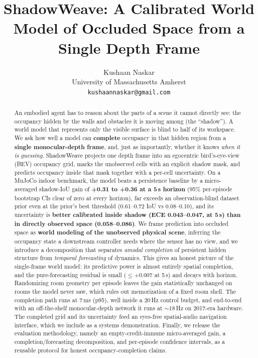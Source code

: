 \documentclass{article}
\title{ShadowWeave: A Calibrated World Model of Occluded Space from a Single Depth Frame}
\author{Kushaan Naskar\\
  University of Massachusetts Amherst\\
  \texttt{kushaannaskar@gmail.com}}
\begin{document}
\maketitle

\begin{abstract}
An embodied agent has to reason about the parts of a scene it cannot directly see: the occupancy
hidden by the walls and obstacles it is moving among (the ``shadow''). A world model that
represents only the visible surface is blind to half of its workspace. We ask how well a model can
\textbf{complete} occupancy in that hidden region from a \textbf{single monocular-depth frame}, and,
just as importantly, whether it knows \emph{when it is guessing}. ShadowWeave projects one depth
frame into an egocentric bird's-eye-view (BEV) occupancy grid, marks the unobserved cells with an
explicit shadow mask, and predicts occupancy inside that mask together with a per-cell uncertainty.
On a MuJoCo indoor benchmark, the model beats a persistence baseline by a micro-averaged shadow-IoU
gain of \textbf{+0.31 to +0.36 at a 5\,s horizon} (95\% per-episode bootstrap CIs clear of zero at
every horizon), far exceeds an observation-blind dataset prior even at the prior's best threshold
(0.61--0.72 IoU vs 0.08--0.10), and its uncertainty is \textbf{better calibrated inside shadow
(ECE 0.043--0.047, at 5\,s) than in directly observed space (0.058--0.086)}. We frame prediction
into occluded space as \textbf{world modeling of the unobserved physical scene}, inferring the
occupancy state a downstream controller needs where the sensor has no view, and we introduce a
decomposition that separates \emph{amodal completion} of persistent hidden structure from
\emph{temporal forecasting} of dynamics. This gives an honest picture of the single-frame world
model: its predictive power is almost entirely spatial completion, and the pure-forecasting
residual is small ($\le$+0.007 at 5\,s) and decays with horizon. Randomizing room geometry per
episode leaves the gain statistically unchanged on rooms the model never saw, which rules out
memorization of a fixed room shell. The completion path runs at 7\,ms (p95), well inside a 20\,Hz
control budget, and end-to-end with an off-the-shelf monocular-depth network it runs at
${\sim}18$\,Hz on 2017-era hardware. The completed grid and its uncertainty feed an eyes-free
spatial-audio navigation interface, which we include as a systems demonstration. Finally, we
release the evaluation methodology, namely an empty-credit-immune micro-averaged gain, a
completion/forecasting decomposition, and per-episode confidence intervals, as a reusable protocol
for honest occupancy-completion claims.
\end{abstract}
\end{document}
